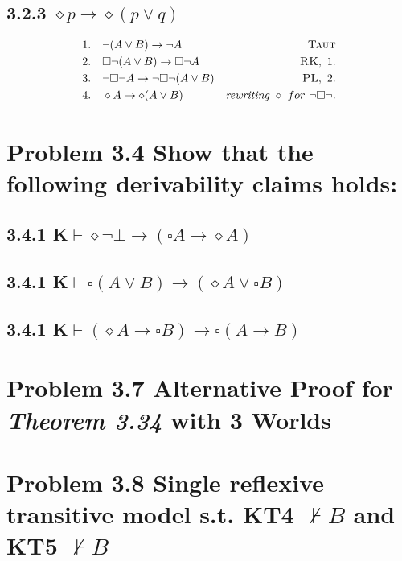 \documentclass{report}
\begin{document}
		\subsection*{3.2.3 $\diamond p \rightarrow \diamond (p \vee q)$}
		\begin{align*}
				& 1. \ \ \ \neg(A \vee B) \rightarrow \neg A & \textsc{Taut} \\
				& 2. \ \ \ \square \neg(A \vee B) \rightarrow \square \neg A & \textsc{RK}, \ 1. \\
				& 3. \ \ \ \neg \square \neg A \rightarrow \neg \square \neg (A \vee B) & \textsc{PL}, \ 2. \\
				& 4. \ \ \ \diamond A \rightarrow \diamond (A \vee B) & \textit{rewriting } \diamond \ for \ \neg \square \neg.
			\end{align*}
		
	\section*{Problem 3.4 Show that the following derivability claims holds:}
		\subsection*{3.4.1 K$\vdash \diamond \neg \bot \rightarrow (\square A \rightarrow \diamond A)$}
		\subsection*{3.4.1 K$\vdash \square (A \vee B) \rightarrow ( \diamond A \vee \square B)$}
		\subsection*{3.4.1 K$\vdash (\diamond A \rightarrow \square B) \rightarrow \square (A \rightarrow B)$}
		
	\section*{Problem 3.7 Alternative Proof for \textit{Theorem 3.34} with 3 Worlds}
	
	\section*{Problem 3.8 Single reflexive transitive model s.t. KT4 $\nvdash B$ and KT5 $\nvdash B$}
\end{document}
